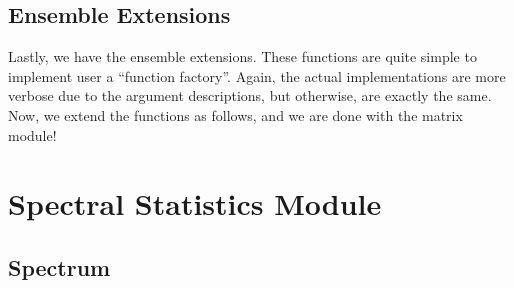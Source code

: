 \subsection{Ensemble Extensions}

Lastly, we have the ensemble extensions. These functions are quite simple to implement user a ``function factory''. Again, the actual implementations are more verbose due to the argument descriptions, but otherwise, are exactly the same.
\trim
\trimm
Now, we extend the functions as follows, and we are done with the matrix module!
\trim

\newpage
\section{Spectral Statistics Module}

\subsection{Spectrum}
\trim
\trimmm \trimm
\trimmm \trimm
\trimmm \trim

\newpage
\trimmm
\trimm
\newpage
